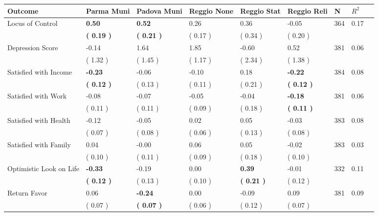 \begin{tabular}{L{6.2cm} C{1.8cm} C{1.8cm} C{1.8cm} C{1.8cm} C{1.8cm} C{1.8cm} C{0.3cm} C{0.3cm}}
\toprule
 \textbf{Outcome} & \textbf{Parma Muni} & \textbf{Padova Muni} & \textbf{Reggio None} & \textbf{Reggio Stat} & \textbf{Reggio Reli} & \textbf{N} & \textbf{$ R^2$} \\
\midrule
Locus of Control & \textbf{     0.50} & \textbf{     0.52} &      0.26 &      0.36 &     -0.05  & 364 &       0.17 \\ 
 & \textbf{(     0.19 )} & \textbf{(     0.21 )} & (     0.17 ) & (     0.34 ) & (     0.20 )  & \\
Depression Score &     -0.14 &      1.64 &      1.85 &     -0.60 &      0.52  & 381 &       0.06 \\ 
 & (     1.32 ) & (     1.45 ) & (     1.17 ) & (     2.34 ) & (     1.38 )  & \\
Satisfied with Income & \textbf{    -0.23} &     -0.06 &     -0.10 &      0.18 & \textbf{    -0.22}  & 384 &       0.08 \\ 
 & \textbf{(     0.12 )} & (     0.13 ) & (     0.11 ) & (     0.21 ) & \textbf{(     0.12 )}  & \\
Satisfied with Work &     -0.08 &     -0.07 &     -0.05 &     -0.04 & \textbf{    -0.18}  & 381 &       0.06 \\ 
 & (     0.11 ) & (     0.11 ) & (     0.09 ) & (     0.18 ) & \textbf{(     0.11 )}  & \\
Satisfied with Health &     -0.12 &     -0.05 &      0.02 &      0.05 &     -0.03  & 383 &       0.08 \\ 
 & (     0.07 ) & (     0.08 ) & (     0.06 ) & (     0.13 ) & (     0.08 )  & \\
Satisfied with Family &      0.04 &     -0.00 &      0.06 &      0.05 &     -0.02  & 383 &       0.03 \\ 
 & (     0.10 ) & (     0.11 ) & (     0.09 ) & (     0.18 ) & (     0.10 )  & \\
Optimistic Look on Life & \textbf{    -0.33} &     -0.19 &      0.00 & \textbf{     0.39} &     -0.01  & 332 &       0.11 \\ 
 & \textbf{(     0.12 )} & (     0.13 ) & (     0.10 ) & \textbf{(     0.21 )} & (     0.12 )  & \\
Return Favor &      0.06 & \textbf{    -0.24} &      0.00 &     -0.09 &      0.09  & 381 &       0.09 \\ 
 & (     0.07 ) & \textbf{(     0.07 )} & (     0.06 ) & (     0.12 ) & (     0.07 )  & \\

\end{tabular}
